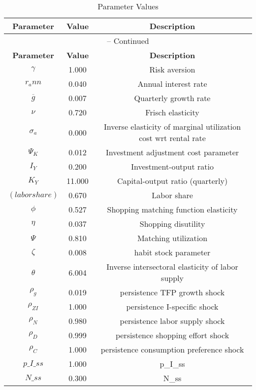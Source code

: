 \begin{center}
\begin{longtable}{ccc}
\caption{Parameter Values}\\%
\toprule%
\multicolumn{1}{c}{\textbf{Parameter}} &
\multicolumn{1}{c}{\textbf{Value}} &
 \multicolumn{1}{c}{\textbf{Description}}\\%
\midrule%
\endfirsthead
\multicolumn{3}{c}{{\tablename} \thetable{} -- Continued}\\%
\midrule%
\multicolumn{1}{c}{\textbf{Parameter}} &
\multicolumn{1}{c}{\textbf{Value}} &
  \multicolumn{1}{c}{\textbf{Description}}\\%
\midrule%
\endhead
${\gamma}$ 	 & 	 1.000 	 & 	 Risk aversion\\
${r_ann}$ 	 & 	 0.040 	 & 	 Annual interest rate\\
${\overline{g}}$ 	 & 	 0.007 	 & 	 Quarterly growth rate\\
$\nu$ 	 & 	 0.720 	 & 	 Frisch elasticity\\
${\sigma_a}$ 	 & 	 0.000 	 & 	 Inverse elasticity of marginal utilization cost wrt rental rate\\
${\Psi_K}$ 	 & 	 0.012 	 & 	 Investment adjustment cost parameter\\
${I_Y}$ 	 & 	 0.200 	 & 	 Investment-output ratio\\
${K_Y}$ 	 & 	 11.000 	 & 	 Capital-output ratio (quarterly)\\
$(labor share)$ 	 & 	 0.670 	 & 	 Labor share\\
${\phi}$ 	 & 	 0.527 	 & 	 Shopping matching function elasticity\\
${\eta}$ 	 & 	 0.037 	 & 	 Shopping disutility\\
${\Psi}$ 	 & 	 0.810 	 & 	 Matching utilization\\
${\zeta}$ 	 & 	 0.008 	 & 	 habit stock parameter\\
${\theta}$ 	 & 	 6.004 	 & 	 Inverse intersectoral elasticity of labor supply\\
${\rho_g}$ 	 & 	 0.019 	 & 	 persistence TFP growth shock\\
${\rho_{ZI}}$ 	 & 	 1.000 	 & 	 persistence I-specific shock\\
${\rho_N}$ 	 & 	 0.980 	 & 	 persistence labor supply shock\\
${\rho_D}$ 	 & 	 0.999 	 & 	 persistence shopping effort shock\\
${\rho_C}$ 	 & 	 1.000 	 & 	 persistence consumption preference shock\\
$p\_I\_ss$ 	 & 	 1.000 	 & 	 p\_I\_ss\\
$N\_ss$ 	 & 	 0.300 	 & 	 N\_ss\\
\bottomrule%
\end{longtable}
\end{center}
